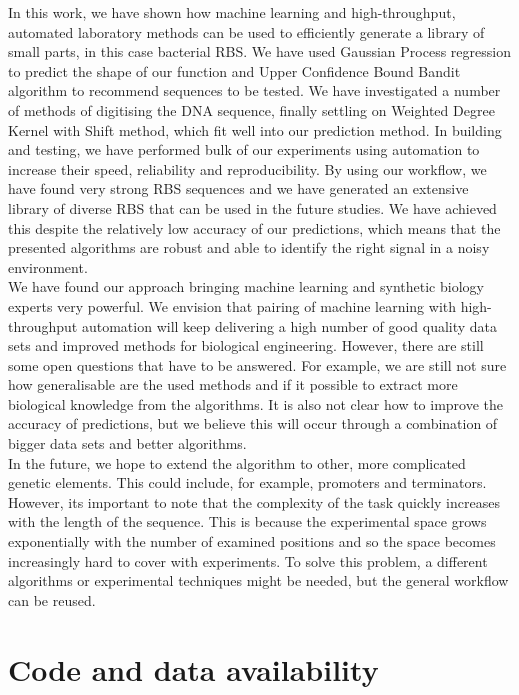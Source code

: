 \documentclass{article}
\begin{document}
In this work, we have shown how machine learning and high-throughput, automated laboratory methods can be used to efficiently generate a library of small parts, in this case bacterial RBS. 
We have used Gaussian Process regression to predict the shape of our function and Upper Confidence Bound Bandit algorithm to recommend sequences to be tested.
We have investigated a number of methods of digitising the DNA sequence, finally settling on Weighted Degree Kernel with Shift method, which fit well into our prediction method.
In building and testing, we have performed bulk of our experiments using automation to increase their speed, reliability and reproducibility.
By using our workflow, we have found very strong RBS sequences and we have generated an extensive library of diverse RBS that can be used in the future studies.
We have achieved this despite the relatively low accuracy of our predictions, which means that the presented algorithms are robust and able to identify the right signal in a noisy environment. \\

We have found our approach bringing machine learning and synthetic biology experts very powerful.
We envision that pairing of machine learning with high-throughput automation will keep delivering a high number of good quality data sets and improved methods for biological engineering.
However, there are still some open questions that have to be answered.
For example, we are still not sure how generalisable are the used methods and if it possible to extract more biological knowledge from the algorithms.
It is also not clear how to improve the accuracy of predictions, but we believe this will occur through  a combination of bigger data sets and better algorithms.\\

In the future, we hope to extend the algorithm to other, more complicated genetic elements.
This could include, for example, promoters and terminators.
However, its important to note that the complexity of the task quickly increases with the length of the sequence.
This is because the experimental space grows exponentially with the number of examined positions and so the space becomes increasingly hard to cover with experiments.
To solve this problem, a different algorithms or experimental techniques might be needed, but the general workflow can be reused.\\



\section*{Code and data availability}
\end{document}
